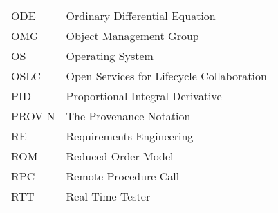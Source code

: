 \begin{longtable}{ll}
ODE & Ordinary Differential Equation \\
OMG     &Object Management Group\\
OS	&Operating System\\
OSLC & Open Services for Lifecycle Collaboration\\
PID     &Proportional Integral Derivative \\
PROV-N  &The Provenance Notation\\
RE & Requirements Engineering \\
ROM & Reduced Order Model\\
RPC     &Remote Procedure Call\\
RTT & Real-Time Tester\\

\end{longtable}
